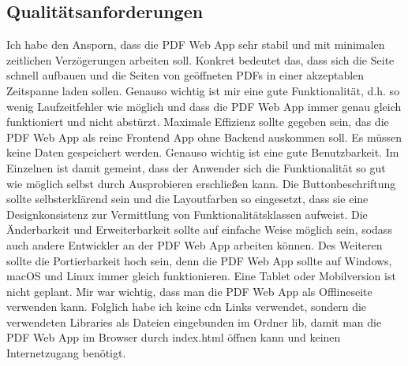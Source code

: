 \subsection{Qualitätsanforderungen}
Ich habe den Ansporn, dass die PDF Web App sehr stabil und mit minimalen zeitlichen Verzögerungen arbeiten soll. Konkret bedeutet das, dass sich die Seite schnell aufbauen und die Seiten von geöffneten PDFs in einer akzeptablen Zeitspanne laden sollen. Genauso wichtig ist mir eine gute Funktionalität, d.h. so wenig Laufzeitfehler wie möglich und dass die PDF Web App immer genau gleich funktioniert und nicht abstürzt. Maximale Effizienz sollte gegeben sein, das die PDF Web App als reine Frontend App ohne Backend auskommen soll. Es müssen keine Daten gespeichert werden. Genauso wichtig ist eine gute Benutzbarkeit. Im Einzelnen ist damit gemeint, dass der Anwender sich die Funktionalität so gut wie möglich selbst durch Ausprobieren erschließen kann. Die Buttonbeschriftung sollte selbsterklärend sein und die Layoutfarben so eingesetzt, dass sie eine Designkonsistenz zur Vermittlung von Funktionalitätsklassen aufweist. Die Änderbarkeit und Erweiterbarkeit sollte auf einfache Weise möglich sein, sodass auch andere Entwickler an der PDF Web App arbeiten können. Des Weiteren sollte die Portierbarkeit hoch sein, denn die PDF Web App sollte auf Windows, macOS und Linux immer gleich funktionieren. Eine Tablet oder Mobilversion ist nicht geplant. Mir war wichtig, dass man die PDF Web App als Offlineseite verwenden kann. Folglich habe ich keine \gls{cdn} Links verwendet, sondern die verwendeten Libraries als Dateien eingebunden im Ordner lib, damit man die PDF Web App im Browser durch index.html öffnen kann und keinen Internetzugang benötigt.
